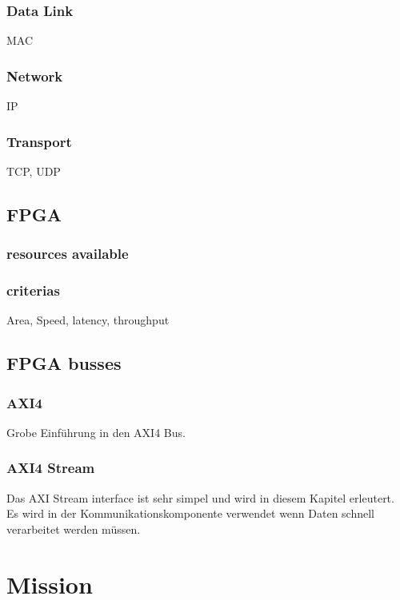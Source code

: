 \subsubsection{Data Link} 
MAC
\subsubsection{Network} 
IP
\subsubsection{Transport} 
TCP, UDP        

\subsection{FPGA}
\subsubsection{resources available}

\subsubsection{criterias}
Area, Speed, latency, throughput


\subsection{FPGA busses}
\subsubsection{AXI4}
Grobe Einführung in den AXI4 Bus.

\subsubsection{AXI4 Stream}
Das AXI Stream interface ist sehr simpel und wird in diesem Kapitel erleutert. 
Es wird in der Kommunikationskomponente verwendet wenn Daten schnell verarbeitet 
werden müssen.
\section{Mission}
